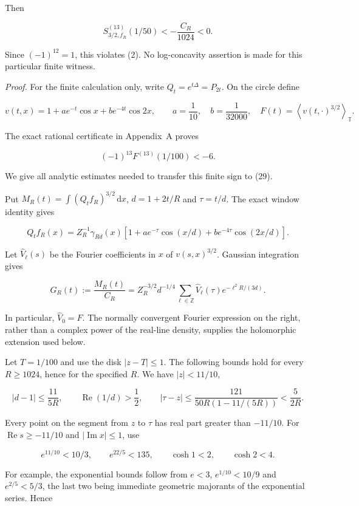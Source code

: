 \documentclass[
  11pt,
]{article}
\begin{document}
Then

\[
\tag{30}
 S_{3/2,f_R}^{(13)}(1/50)<-\frac{C_R}{1024}<0.
\]

Since \((-1)^{12}=1\), this violates (2). No log-concavity assertion is
made for this particular finite witness.

\emph{Proof.} For the finite calculation only, write
\(Q_t=e^{t\Delta}=P_{2t}\). On the circle define

\[
v(t,x)=1+ae^{-t}\cos x+be^{-4t}\cos2x,
 \qquad a=\frac1{10},\quad b=\frac1{32000},\quad
 F(t)=\left\langle v(t,\cdot)^{3/2}\right\rangle_{\mathbb T}.
\]

The exact rational certificate in Appendix~A proves

\[
\tag{31}
 (-1)^{13}F^{(13)}(1/100)<-6.
\]

We give all analytic estimates needed to transfer this finite sign to
(29).

Put \(M_R(t)=\int(Q_tf_R)^{3/2}\,\mathrm dx\), \(d=1+2t/R\) and
\(\tau=t/d\). The exact window identity gives

\[
Q_tf_R(x)=Z_R^{-1}\gamma_{Rd}(x)
  [1+ae^{-\tau}\cos(x/d)+be^{-4\tau}\cos(2x/d)].
\]

Let \(\widehat V_\ell(s)\) be the Fourier coefficients in \(x\) of
\(v(s,x)^{3/2}\). Gaussian integration gives

\[
\tag{32}
 G_R(t):=\frac{M_R(t)}{C_R}
 =Z_R^{-3/2}d^{-1/4}
   \sum_{\ell\in\mathbb Z}\widehat V_\ell(\tau)
                   e^{-\ell^2R/(3d)}.
\]

In particular, \(\widehat V_0=F\). The normally convergent Fourier
expression on the right, rather than a complex power of the real-line
density, supplies the holomorphic extension used below.

Let \(T=1/100\) and use the disk \(|z-T|\leq1\). The following bounds
hold for every \(R\geq1024\), hence for the specified \(R\). We have
\(|z|<11/10\),

\[
|d-1|\leq\frac{11}{5R},\qquad
 \operatorname{Re}(1/d)>\frac12,\qquad
 |\tau-z|\leq\frac{121}{50R(1-11/(5R))}<\frac5{2R}.
\]

Every point on the segment from \(z\) to \(\tau\) has real part greater
than \(-11/10\). For \(\operatorname{Re}s\geq-11/10\) and
\(|\operatorname{Im}x|\leq1\), use

\[
e^{11/10}<10/3,\qquad e^{22/5}<135,\qquad
 \cosh1<2,\qquad \cosh2<4.
\]

For example, the exponential bounds follow from \(e<3\),
\(e^{1/10}<10/9\) and \(e^{2/5}<5/3\), the last two being immediate
geometric majorants of the exponential series. Hence
\end{document}
